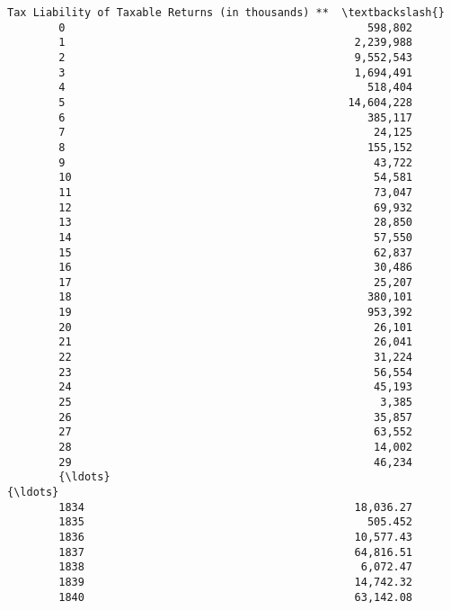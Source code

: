 \documentclass[11pt]{article}
\begin{document}
\begin{Verbatim}[commandchars=\\\{\}]
             Tax Liability of Taxable Returns (in thousands) **  \textbackslash{}
        0                                               598,802   
        1                                             2,239,988   
        2                                             9,552,543   
        3                                             1,694,491   
        4                                               518,404   
        5                                            14,604,228   
        6                                               385,117   
        7                                                24,125   
        8                                               155,152   
        9                                                43,722   
        10                                               54,581   
        11                                               73,047   
        12                                               69,932   
        13                                               28,850   
        14                                               57,550   
        15                                               62,837   
        16                                               30,486   
        17                                               25,207   
        18                                              380,101   
        19                                              953,392   
        20                                               26,101   
        21                                               26,041   
        22                                               31,224   
        23                                               56,554   
        24                                               45,193   
        25                                                3,385   
        26                                               35,857   
        27                                               63,552   
        28                                               14,002   
        29                                               46,234   
        {\ldots}                                                 {\ldots}   
        1834                                          18,036.27   
        1835                                            505.452   
        1836                                          10,577.43   
        1837                                          64,816.51   
        1838                                           6,072.47   
        1839                                          14,742.32   
        1840                                          63,142.08   

\end{Verbatim}
\end{document}
